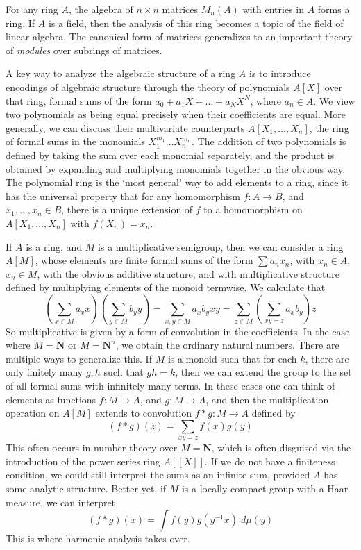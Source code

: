 \begin{example}
    For any ring $A$, the algebra of $n \times n$ matrices $M_n(A)$ with entries in $A$ forms a ring. If $A$ is a field, then the analysis of this ring becomes a topic of the field of linear algebra. The canonical form of matrices generalizes to an important theory of {\it modules} over subrings of matrices.
\end{example}

\begin{example}
    A key way to analyze the algebraic structure of a ring $A$ is to introduce encodings of algebraic structure through the theory of polynomials $A[X]$ over that ring, formal sums of the form $a_0 + a_1X + \dots + a_NX^N$, where $a_n \in A$. We view two polynomials as being equal precisely when their coefficients are equal. More generally, we can discuss their multivariate counterparts $A[X_1, \dots, X_n]$, the ring of formal sums in the monomials $X_1^{m_1} \dots X_n^{m_n}$. The addition of two polynomials is defined by taking the sum over each monomial separately, and the product is obtained by expanding and multiplying monomials together in the obvious way. The polynomial ring is the `most general' way to add elements to a ring, since it has the universal property that for any homomorphism $f: A \to B$, and $x_1, \dots, x_n \in B$, there is a unique extension of $f$ to a homomorphism on $A[X_1, \dots, X_n]$ with $f(X_n) = x_n$.
\end{example}

\begin{example}
    If $A$ is a ring, and $M$ is a multiplicative semigroup, then we can consider a ring $A[M]$, whose elements are finite formal sums of the form $\sum a_n x_n$, with $x_n \in A$, $x_n \in M$, with the obvious additive structure, and with multiplicative structure defined by multiplying elements of the monoid termwise. We calculate that
    \[ \left( \sum_{x \in M} a_x x \right) \left( \sum_{y \in M} b_y y \right) = \sum_{x,y \in M} a_x b_y xy = \sum_{z \in M} \left( \sum_{xy = z} a_x b_y \right) z \]
    So multiplicative is given by a form of convolution in the coefficients. In the case where $M = \mathbf{N}$ or $M = \mathbf{N}^n$, we obtain the ordinary natural numbers. There are multiple ways to generalize this. If $M$ is a monoid such that for each $k$, there are only finitely many $g,h$ such that $gh = k$, then we can extend the group to the set of all formal sums with infinitely many terms. In these cases one can think of elements as functions $f: M \to A$, and $g: M \to A$, and then the multiplication operation on $A[M]$ extends to convolution $f * g: M \to A$ defined by
    \[ (f * g)(z) = \sum_{xy = z} f(x) g(y) \]
    This often occurs in number theory over $M = \mathbf{N}$, which is often disguised via the introduction of the power series ring $A[[X]]$. If we do not have a finiteness condition, we could still interpret the sums as an infinite sum, provided $A$ has some analytic structure. Better yet, if $M$ is a locally compact group with a Haar measure, we can interpret
    \[ (f * g)(x) = \int f(y) g(y^{-1}x)\; d\mu(y) \]
    This is where harmonic analysis takes over.
\end{example}

